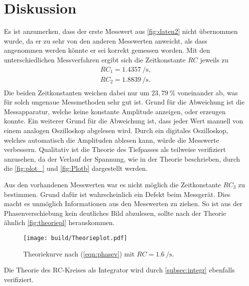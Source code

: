 \section{Diskussion}
\label{sec:Diskussion}

Es ist anzumerken, dass der erste Messwert aus \autoref{fig:daten2} nicht übernommen wurde, da er zu sehr von den anderen Messwerten anweicht,
als dass angenommen werden könnte er sei korrekt gemessen worden.
Mit den unterschiedlichen Messverfahren ergibt sich die Zeitkonstante $RC$ jeweils zu 
\begin{align*}
    RC_1 = \SI{1.4357}{\per\second}, \\
    RC_2 = \SI{1.8839}{\per\second}. \\
\end{align*}
Die beiden Zeitkonstanten weichen dabei nur um $23,79 \:\%$ voneinander ab, was für solch ungenaue Messmethoden sehr gut ist.
Grund für die Abweichung ist die Messapparatur, welche keine konstante Amplitude anzeigen, oder erzeugen konnte.
Ein weiterer Grund für die Abweichung ist, dass jeder Wert manuell von einem analogen Oszilloskop abgelesen wird. Durch ein digitales 
Oszilloskop, welches automatisch die Amplituden ablesen kann, würde die Messwerte verbessern.
Qualitativ ist die Theorie des Tiefpasses als teilweise verifiziert anzusehen, da der Verlauf der Spannung, wie in der Theorie beschrieben,
durch die \autoref{fig:plot_} und \autoref{fig:Plotb} dargestellt werden.

Aus den vorhandenen Messwerten war es nicht möglich die Zeitkonstante $RC_3$ zu bestimmen. Grund dafür ist wahrscheinlich ein Defekt
beim Messgerät. Dies macht es unmöglich Informationen aus den Messwerten zu ziehen. So ist aus der Phasenverschiebung kein deutliches Bild
abzulesen, sollte nach der Theorie ähnlich \autoref{fig:theoriepl} herauskommen.
\begin{figure}[H]
    \centering
    \texttt{[image: build/Theorieplot.pdf]}
    \caption{Theoriekurve nach (\ref{eqn:phasev}) mit $RC=\SI{1,6}{\per\second}$.}
    \label{fig:theoriepl}
\end{figure}

Die Theorie des RC-Kreises als Integrator wird durch \autoref{subsec:integr} ebenfalls verifiziert.